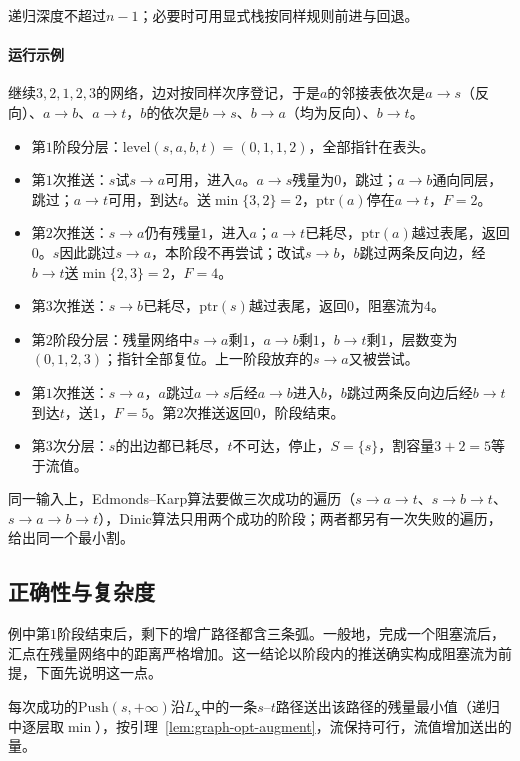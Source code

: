 递归深度不超过$n-1$；必要时可用显式栈按同样规则前进与回退。

\paragraph{运行示例}
继续$3,2,1,2,3$的网络，边对按同样次序登记，于是$a$的邻接表依次是$a\to s$（反向）、$a\to b$、$a\to t$，$b$的依次是$b\to s$、$b\to a$（均为反向）、$b\to t$。
\begin{itemize}
  \item 第$1$阶段分层：$\mathrm{level}(s,a,b,t)=(0,1,1,2)$，全部指针在表头。
  \item 第$1$次推送：$s$试$s\to a$可用，进入$a$。$a\to s$残量为$0$，跳过；$a\to b$通向同层，跳过；$a\to t$可用，到达$t$。送$\min\{3,2\}=2$，$\mathrm{ptr}(a)$停在$a\to t$，$F=2$。
  \item 第$2$次推送：$s\to a$仍有残量$1$，进入$a$；$a\to t$已耗尽，$\mathrm{ptr}(a)$越过表尾，返回$0$。$s$因此跳过$s\to a$，本阶段不再尝试；改试$s\to b$，$b$跳过两条反向边，经$b\to t$送$\min\{2,3\}=2$，$F=4$。
  \item 第$3$次推送：$s\to b$已耗尽，$\mathrm{ptr}(s)$越过表尾，返回$0$，阻塞流为$4$。
  \item 第$2$阶段分层：残量网络中$s\to a$剩$1$，$a\to b$剩$1$，$b\to t$剩$1$，层数变为$(0,1,2,3)$；指针全部复位。上一阶段放弃的$s\to a$又被尝试。
  \item 第$1$次推送：$s\to a$，$a$跳过$a\to s$后经$a\to b$进入$b$，$b$跳过两条反向边后经$b\to t$到达$t$，送$1$，$F=5$。第$2$次推送返回$0$，阶段结束。
  \item 第$3$次分层：$s$的出边都已耗尽，$t$不可达，停止，$S=\{s\}$，割容量$3+2=5$等于流值。
\end{itemize}
同一输入上，Edmonds--Karp算法要做三次成功的遍历（$s\to a\to t$、$s\to b\to t$、$s\to a\to b\to t$），Dinic算法只用两个成功的阶段；两者都另有一次失败的遍历，给出同一个最小割。

\subsection{正确性与复杂度}

例中第$1$阶段结束后，剩下的增广路径都含三条弧。一般地，完成一个阻塞流后，汇点在残量网络中的距离严格增加。这一结论以阶段内的推送确实构成阻塞流为前提，下面先说明这一点。

每次成功的$\mathrm{Push}(s,+\infty)$沿$L_{\bm x}$中的一条$s$--$t$路径送出该路径的残量最小值（递归中逐层取$\min$），按引理~\ref{lem:graph-opt-augment}，流保持可行，流值增加送出的量。

